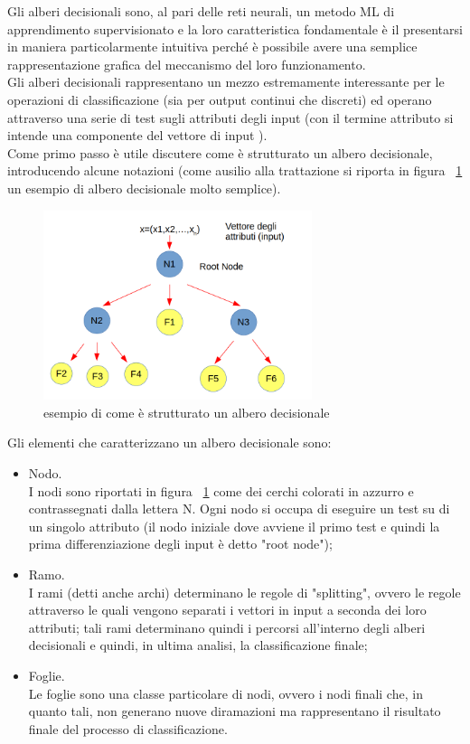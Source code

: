 Gli alberi decisionali sono, al pari delle reti neurali, un metodo ML di apprendimento supervisionato e  la loro caratteristica fondamentale è il presentarsi in maniera particolarmente intuitiva perché è possibile avere una semplice rappresentazione grafica del meccanismo del loro funzionamento. \\
Gli alberi decisionali rappresentano un mezzo estremamente interessante per le operazioni di classificazione (sia per output continui che discreti) ed operano attraverso una serie di test sugli attributi degli input (con il termine attributo si intende una componente del vettore di input ). \\ 
Come primo passo è utile discutere come è strutturato un albero decisionale, introducendo alcune notazioni (come ausilio alla trattazione si riporta in figura ~\ref{schemaDT} un esempio di albero decisionale molto semplice).\\
\begin{figure} [h!]
	\centering
	\includegraphics[width=0.70\textwidth]{figs/schemaDT.png}
	\caption{esempio di come è strutturato un albero decisionale}
	\label{schemaDT}
\end{figure}
Gli elementi che caratterizzano un albero decisionale sono:
\begin{itemize}
	\item Nodo. \\
	I nodi sono riportati in figura ~\ref{schemaDT} come dei cerchi colorati in azzurro e contrassegnati dalla lettera N. Ogni nodo si occupa di eseguire un test su di un singolo attributo (il nodo iniziale dove avviene il primo test e quindi la prima differenziazione degli input è detto "root node");
	\item Ramo. \\
	I rami (detti anche archi) determinano le regole di "splitting", ovvero le regole attraverso le quali vengono separati i vettori in input a seconda dei loro attributi; tali rami determinano quindi i percorsi all'interno degli alberi decisionali e quindi, in ultima analisi, la classificazione finale;
	\item Foglie. \\
	Le foglie sono una classe particolare di nodi, ovvero i nodi finali che, in quanto tali, non generano nuove diramazioni ma rappresentano il risultato finale del processo di classificazione.
\end{itemize}

